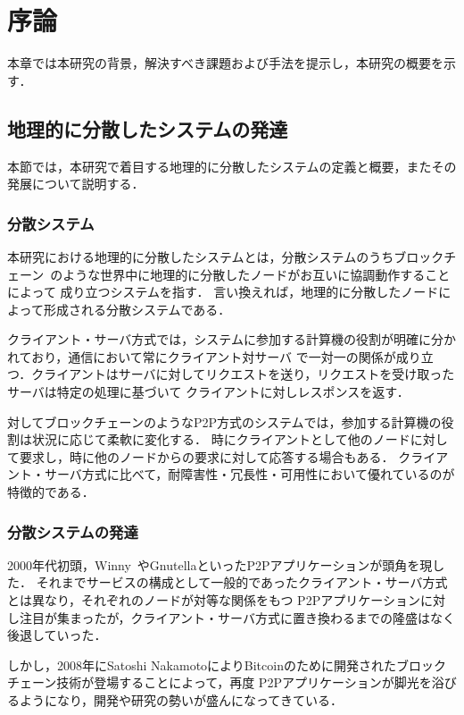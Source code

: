 \chapter{序論}
\label{introduction}

本章では本研究の背景，解決すべき課題および手法を提示し，本研究の概要を示す．

\section{地理的に分散したシステムの発達}
\label{introduction:system-growth}

本節では，本研究で着目する地理的に分散したシステムの定義と概要，またその発展について説明する．

\subsection{分散システム}

本研究における地理的に分散したシステムとは，分散システムのうちブロックチェーン~\cite{Bitcoin}のような世界中に地理的に分散したノードがお互いに協調動作することによって
成り立つシステムを指す．
言い換えれば，地理的に分散したノードによって形成される分散システムである．

クライアント・サーバ方式では，システムに参加する計算機の役割が明確に分かれており，通信において常にクライアント対サーバ
で一対一の関係が成り立つ．クライアントはサーバに対してリクエストを送り，リクエストを受け取ったサーバは特定の処理に基づいて
クライアントに対しレスポンスを返す．

対してブロックチェーンのようなP2P方式のシステムでは，参加する計算機の役割は状況に応じて柔軟に変化する．
時にクライアントとして他のノードに対して要求し，時に他のノードからの要求に対して応答する場合もある．
クライアント・サーバ方式に比べて，耐障害性・冗長性・可用性において優れているのが特徴的である．

\subsection{分散システムの発達}

2000年代初頭，Winny~\cite{Winny}やGnutellaといったP2Pアプリケーションが頭角を現した．
それまでサービスの構成として一般的であったクライアント・サーバ方式とは異なり，それぞれのノードが対等な関係をもつ
P2Pアプリケーションに対し注目が集まったが，クライアント・サーバ方式に置き換わるまでの隆盛はなく後退していった．

しかし，2008年にSatoshi NakamotoによりBitcoinのために開発されたブロックチェーン技術が登場することによって，再度
P2Pアプリケーションが脚光を浴びるようになり，開発や研究の勢いが盛んになってきている．

